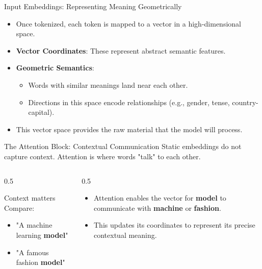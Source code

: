 \documentclass[aspectratio=169]{beamer}
\begin{document}
\begin{frame}{Input Embeddings: Representing Meaning Geometrically}
  \begin{itemize}
    \item Once tokenized, each token is mapped to a vector in a high-dimensional space.
    \item \textbf{Vector Coordinates}: These represent abstract semantic features.
    \item \textbf{Geometric Semantics}:
      \begin{itemize}
        \item Words with similar meanings land near each other.
        \item Directions in this space encode relationships (e.g., gender, tense, country-capital).
      \end{itemize}
    \item This vector space provides the raw material that the model will process.
  \end{itemize}
\end{frame}

\begin{frame}{The Attention Block: Contextual Communication}
  Static embeddings do not capture context. Attention is where words "talk" to each other.
  
  \begin{columns}
    \begin{column}{0.5\textwidth}
      \begin{exampleblock}{Context matters}
        Compare:
        \begin{itemize}
          \item "A machine learning \textbf{model}"
          \item "A famous fashion \textbf{model}"
        \end{itemize}
      \end{exampleblock}
    \end{column}
    \begin{column}{0.5\textwidth}
      \begin{itemize}
        \item Attention enables the vector for \textbf{model} to communicate with \textbf{machine} or \textbf{fashion}.
        \item This updates its coordinates to represent its precise contextual meaning.
      \end{itemize}
    \end{column}
  \end{columns}
\end{frame}
\end{document}
